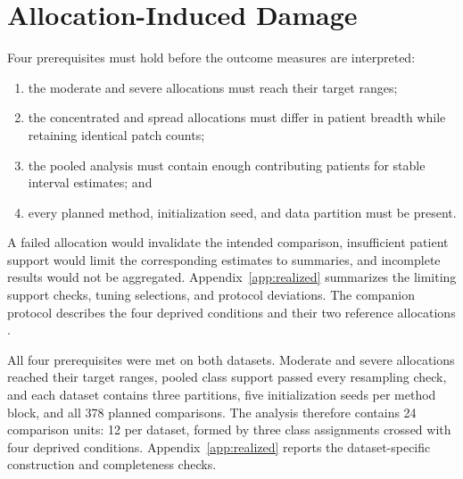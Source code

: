 \documentclass[11pt]{article}
\begin{document}
\section{Allocation-Induced Damage}
\label{sec:rq1}
Four prerequisites must hold before the outcome measures are interpreted:
\begin{enumerate}
  \item the moderate and severe allocations must reach their target ranges;
  \item the concentrated and spread allocations must differ in patient breadth while retaining identical patch counts;
  \item the pooled analysis must contain enough contributing patients for stable interval estimates; and
  \item every planned method, initialization seed, and data partition must be present.
\end{enumerate}
\par\noindent A failed allocation would invalidate the intended comparison, insufficient patient support would limit the corresponding estimates to summaries, and incomplete results would not be aggregated. Appendix~\ref{app:realized} summarizes the limiting support checks, tuning selections, and protocol deviations. The companion protocol describes the four deprived conditions and their two reference allocations \citep{queisler2026benchmarkProtocol}.

All four prerequisites were met on both datasets. Moderate and severe allocations reached their target ranges, pooled class support passed every resampling check, and each dataset contains three partitions, five initialization seeds per method block, and all \num{378} planned comparisons. The analysis therefore contains \num{24} comparison units: \num{12} per dataset, formed by three class assignments crossed with four deprived conditions. Appendix~\ref{app:realized} reports the dataset-specific construction and completeness checks.
\end{document}
